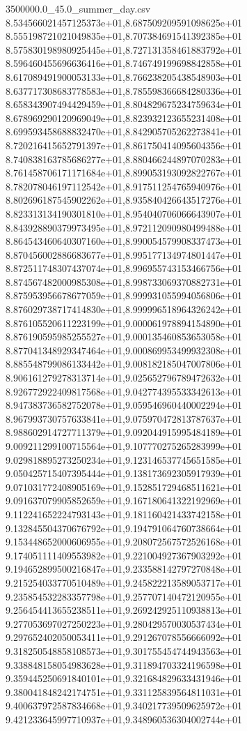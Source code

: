 \begin{filecontents*}{3500000.0_45.0_summer_day.csv}
8.534566021457125373e+01,8.687509209591098625e+01
8.555198721021049835e+01,8.707384691541392385e+01
8.575830198980925445e+01,8.727131358461883792e+01
8.596460455696636416e+01,8.746749199698842858e+01
8.617089491900053133e+01,8.766238205438548903e+01
8.637717308683778583e+01,8.785598366684280336e+01
8.658343907494429459e+01,8.804829675234759634e+01
8.678969290120969049e+01,8.823932123655231408e+01
8.699593458688832470e+01,8.842905705262273841e+01
8.720216415652791397e+01,8.861750414095604356e+01
8.740838163785686277e+01,8.880466244897070283e+01
8.761458706171171684e+01,8.899053193092822767e+01
8.782078046197112542e+01,8.917511254765940976e+01
8.802696187545902262e+01,8.935840426643517276e+01
8.823313134190301810e+01,8.954040706066643907e+01
8.843928890379973495e+01,8.972112090980499488e+01
8.864543460640307160e+01,8.990054579908337473e+01
8.870456002886683677e+01,8.995177134974801447e+01
8.872511748307437074e+01,8.996955743153466756e+01
8.874567482000985308e+01,8.998733069370882731e+01
8.875953956678677059e+01,8.999931055994056806e+01
8.876029738717414830e+01,8.999996518964326242e+01
8.876105520611223199e+01,9.000061978894154890e+01
8.876190595985255527e+01,9.000135460853653058e+01
8.877041348929347464e+01,9.000869953499932308e+01
8.885548799086133442e+01,9.008182185047007806e+01
8.906161279278313714e+01,9.025652796789472632e+01
8.926772922409817568e+01,9.042774395533342613e+01
8.947383736582752078e+01,9.059546960440002294e+01
8.967993730757633841e+01,9.075970472813787637e+01
8.988602914727711379e+01,9.092044915995484189e+01
9.009211299100715564e+01,9.107770275265283999e+01
9.029818895273250234e+01,9.123146537745651585e+01
9.050425715407395444e+01,9.138173692305917939e+01
9.071031772408905169e+01,9.152851729468511621e+01
9.091637079905852659e+01,9.167180641322192969e+01
9.112241652224793143e+01,9.181160421433742158e+01
9.132845504370676792e+01,9.194791064760738664e+01
9.153448652000606955e+01,9.208072567572526168e+01
9.174051111409553982e+01,9.221004927367903292e+01
9.194652899500216847e+01,9.233588142797270848e+01
9.215254033770510489e+01,9.245822213589053717e+01
9.235854532283357798e+01,9.257707140472120955e+01
9.256454413655238511e+01,9.269242925110938813e+01
9.277053697027250223e+01,9.280429570030537434e+01
9.297652402050053411e+01,9.291267078556666092e+01
9.318250548858108573e+01,9.301755454744943563e+01
9.338848158054983628e+01,9.311894703324196598e+01
9.359445250691840101e+01,9.321684829633431946e+01
9.380041848242174751e+01,9.331125839564811031e+01
9.400637972587834668e+01,9.340217739509625972e+01
9.421233645997710937e+01,9.348960536304002744e+01

\end{filecontents*}
